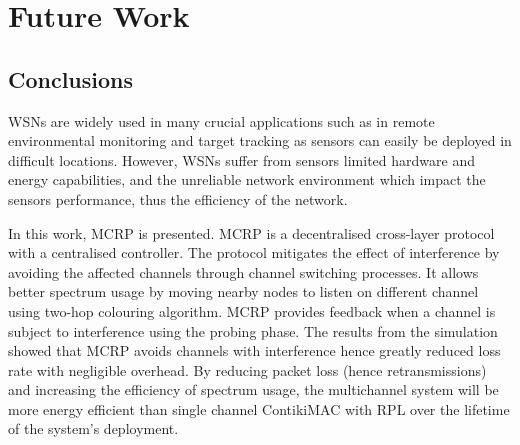 \chapter{Future Work}
\label{futureWork}

\section{Conclusions}
WSNs are widely used in many crucial applications such as in remote environmental monitoring and target tracking as sensors can easily be deployed in difficult locations. However, WSNs suffer from sensors limited hardware and energy capabilities, and the unreliable network environment which impact the sensors performance, thus the efficiency of the network.  

In this work, MCRP is presented. MCRP is a decentralised cross-layer protocol with a centralised controller. The protocol mitigates the effect of interference by avoiding the affected channels through channel switching processes. It allows better spectrum usage by moving nearby nodes to listen on different channel using two-hop colouring algorithm. MCRP provides feedback when a channel is subject to interference using the probing phase. The results from the simulation showed that MCRP avoids channels with interference hence greatly reduced loss rate with negligible overhead. By reducing packet loss (hence retransmissions) and increasing the efficiency of spectrum usage, the multichannel system will be more energy efficient than single channel ContikiMAC with RPL over the lifetime of the system's deployment. 


